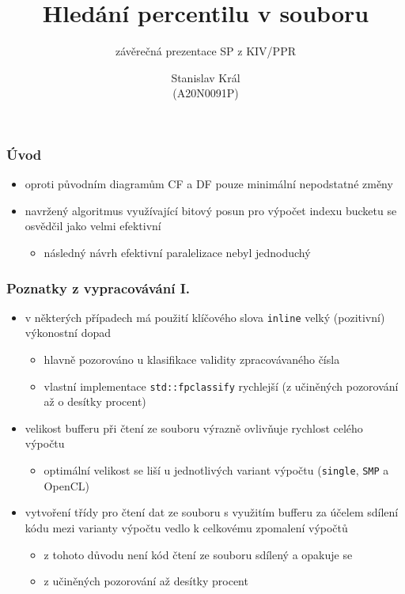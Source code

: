 \documentclass[xcolor=dvipsnames]{beamer}
\title[závěrečná prezentace SP] %
{Hledání percentilu v souboru}
\subtitle{závěrečná prezentace SP z KIV/PPR}
\institute[ZČU FAV] %
{
    Západočeská univerzita v Plzni
    \and
    Fakulta aplikovaných věd
}
\author[Stanislav Král]  %
{Stanislav Král \\\tiny{(A20N0091P)}}
\begin{document}
\begin{frame}
  \titlepage
\end{frame}

\begin{frame}
\frametitle{Úvod}
	\begin{itemize}
        \item oproti původním diagramům CF a DF pouze minimální nepodstatné změny
        \item navržený algoritmus využívající bitový posun pro výpočet indexu bucketu se osvědčil jako velmi efektivní
        \begin{itemize}
            \item následný návrh efektivní paralelizace nebyl jednoduchý 
        \end{itemize}
  	\end{itemize}
\end{frame}

\begin{frame}
\frametitle{Poznatky z vypracovávání I.}
    \begin{itemize}
        \item v některých případech má použití klíčového slova \texttt{inline} velký (pozitivní) výkonostní dopad
        \begin{itemize}
            \item hlavně pozorováno u klasifikace validity zpracovávaného čísla
            \item vlastní implementace \texttt{std::fpclassify} rychlejší (z učiněných pozorování až o desítky procent)
        \end{itemize}
        \item velikost bufferu při čtení ze souboru výrazně ovlivňuje rychlost celého výpočtu
        \begin{itemize}
            \item optimální velikost se liší u jednotlivých variant výpočtu (\texttt{single}, \texttt{SMP} a OpenCL)
        \end{itemize}
        \item vytvoření třídy pro čtení dat ze souboru s využitím bufferu za účelem sdílení kódu mezi varianty výpočtu vedlo k celkovému zpomalení výpočtů
        \begin{itemize}
            \item z tohoto důvodu není kód čtení ze souboru sdílený a opakuje se
            \item z učiněných pozorování až desítky procent
        \end{itemize}
    \end{itemize}
\end{frame}
\end{document}
